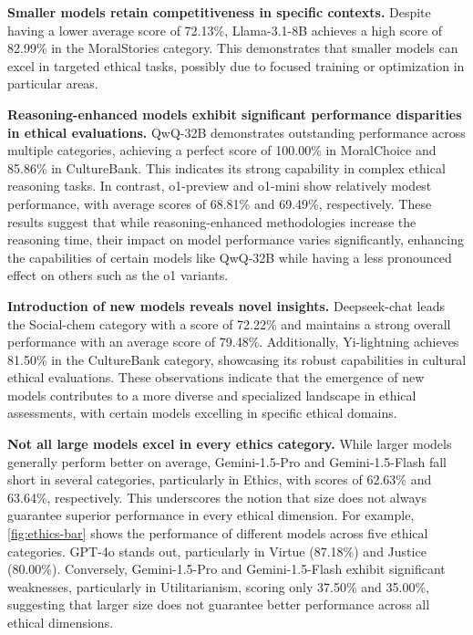 \textbf{Smaller models retain competitiveness in specific contexts.} Despite having a lower average score of 72.13\%, Llama-3.1-8B achieves a high score of 82.99\% in the MoralStories category. This demonstrates that smaller models can excel in targeted ethical tasks, possibly due to focused training or optimization in particular areas.

\textbf{Reasoning-enhanced models exhibit significant performance disparities in ethical evaluations.} QwQ-32B demonstrates outstanding performance across multiple categories, achieving a perfect score of 100.00\% in MoralChoice and 85.86\% in CultureBank. This indicates its strong capability in complex ethical reasoning tasks. In contrast, o1-preview and o1-mini show relatively modest performance, with average scores of 68.81\% and 69.49\%, respectively. These results suggest that while reasoning-enhanced methodologies increase the reasoning time, their impact on model performance varies significantly, enhancing the capabilities of certain models like QwQ-32B while having a less pronounced effect on others such as the o1 variants.

\textbf{Introduction of new models reveals novel insights.} Deepseek-chat leads the Social-chem category with a score of 72.22\% and maintains a strong overall performance with an average score of 79.48\%. Additionally, Yi-lightning achieves 81.50\% in the CultureBank category, showcasing its robust capabilities in cultural ethical evaluations. These observations indicate that the emergence of new models contributes to a more diverse and specialized landscape in ethical assessments, with certain models excelling in specific ethical domains.

\textbf{Not all large models excel in every ethics category.} While larger models generally perform better on average, Gemini-1.5-Pro and Gemini-1.5-Flash fall short in several categories, particularly in Ethics, with scores of 62.63\% and 63.64\%, respectively. This underscores the notion that size does not always guarantee superior performance in every ethical dimension. For example, \autoref{fig:ethics-bar} shows the performance of different models across five ethical categories. GPT-4o stands out, particularly in Virtue (87.18\%) and Justice (80.00\%). Conversely, Gemini-1.5-Pro and Gemini-1.5-Flash exhibit significant weaknesses, particularly in Utilitarianism, scoring only 37.50\% and 35.00\%, suggesting that larger size does not guarantee better performance across all ethical dimensions.

\newpage

